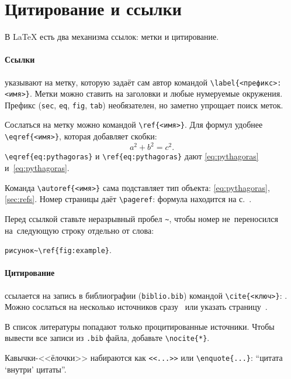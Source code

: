 
\section{Цитирование и ссылки}\label{sec:refs}
В \LaTeX{} есть два механизма ссылок: метки и цитирование.

\paragraph{Ссылки} указывают на метку, которую задаёт сам автор командой
\verb+\label{<префикс>:<имя>}+. Метки можно ставить на заголовки и любые
нумеруемые окружения. Префикс (\texttt{sec}, \texttt{eq}, \texttt{fig},
\texttt{tab}) необязателен, но заметно упрощает поиск меток.

Сослаться на метку можно командой \verb+\ref{<имя>}+. Для формул удобнее
\verb+\eqref{<имя>}+, которая добавляет скобки:
\begin{equation}\label{eq:pythagoras}
    a^2 + b^2 = c^2.
\end{equation}
\verb+\eqref{eq:pythagoras}+ и \verb+\ref{eq:pythagoras}+ дают
\eqref{eq:pythagoras} и~\ref{eq:pythagoras}.

Команда \verb+\autoref{<имя>}+ сама подставляет тип объекта:
\autoref{eq:pythagoras}, \autoref{sec:refs}.
Номер страницы даёт \verb+\pageref+: формула находится на
с.~\pageref{eq:pythagoras}.

Перед ссылкой ставьте неразрывный пробел \verb+~+, чтобы номер не~переносился
на~следующую строку отдельно от слова:
\begin{center}
    \verb+рисунок~\ref{fig:example}+.
\end{center}

\paragraph{Цитирование} ссылается на запись в библиографии (\texttt{biblio.bib})
командой \verb+\cite{<ключ>}+: \cite{knuth1986}. Можно сослаться на несколько
источников сразу~\cite{lamport1994, lvovsky2003} или указать
страницу~\cite[с.~15]{lvovsky2003}.

В список литературы попадают только процитированные источники. Чтобы вывести
все записи из \texttt{.bib} файла, добавьте \verb+\nocite{*}+.

Кавычки-<<ёлочки>> набираются как \verb+<<...>>+ или \verb+\enquote{...}+:
\enquote{цитата \enquote{внутри} цитаты}.
